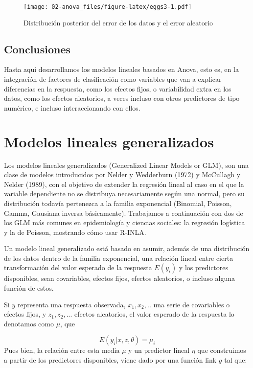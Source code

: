 \documentclass[
]{book}
\begin{document}
\begin{figure}
\centering
\texttt{[image: 02-anova\_files/figure-latex/eggs3-1.pdf]}
\caption{\label{fig:eggs3}Distribución posterior del error de los datos y el error aleatorio}
\end{figure}

\hypertarget{conclusiones-1}{%
\section{Conclusiones}\label{conclusiones-1}}

Hasta aquí desarrollamos los modelos lineales basados en Anova, esto es, en la integración de factores de clasificación como variables que van a explicar diferencias en la respuesta, como los efectos fijos, o variabilidad extra en los datos, como los efectos aleatorios, a veces incluso con otros predictores de tipo numérico, e incluso interaccionando con ellos.

\hypertarget{glm}{%
\chapter{Modelos lineales generalizados}\label{glm}}

Los modelos lineales generalizados (Generalized Linear Models or GLM), son una clase de modelos introducidos por Nelder y Wedderburn (1972) y McCullagh y Nelder (1989), con el objetivo de extender la regresión lineal al caso en el que la variable dependiente no se distribuya necesariamente según una normal, pero su distribución todavía pertenezca a la familia exponencial (Binomial, Poisson, Gamma, Gausiana inversa básicamente). Trabajamos a continuación con dos de los GLM más comunes en epidemiología y ciencias sociales: la regresión logística y la de Poisson, mostrando cómo usar R-INLA.

Un modelo lineal generalizado está basado en asumir, además de una distribución de los datos dentro de la familia exponencial, una relación lineal entre cierta transformación del valor esperado de la respuesta \(E(y_i)\) y los predictores disponibles, sean covariables, efectos fijos, efectos aleatorios, o incluso alguna función de estos.

Si \(y\) representa una respuesta observada, \(x_1,x_2,..\) una serie de covariables o efectos fijos, y \(z_1,z_2,...\) efectos aleatorios, el valor esperado de la respuesta lo denotamos como \(\mu\), que

\[E(y_i|x,z,\theta)=\mu_i\]
Pues bien, la relación entre esta media \(\mu\) y un predictor lineal \(\eta\) que construimos a partir de los predictores disponibles, viene dado por una función link \(g\) tal que:
\end{document}

